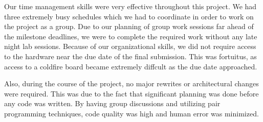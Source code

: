 \documentclass[oneside]{report}
\begin{document}
Our time management skills were very effective throughout this project. We had
three extremely busy schedules which we had to coordinate in order to work on
the project as a group. Due to our planning of group work sessions far ahead of
the milestone deadlines, we were to complete the required work without any late
night lab sessions. Because of our organizational skills, we did not require
access to the hardware near the due date of the final submission. This was
fortuitus, as access to a coldfire board became extremely diffcult as the due
date approached.

Also, during the course of the project, no major rewrites or architectural
changes were required. This was due to the fact that significant planning was
done before any code was written. By having group discussions and utilizing
pair programming techniques, code quality was high and human error was
minimized.
\end{document}
